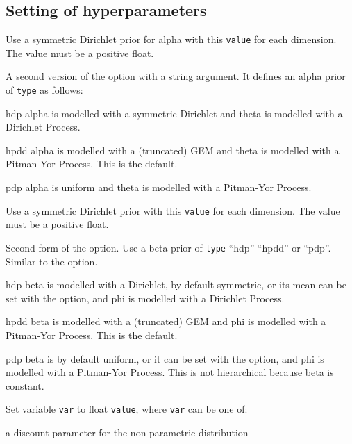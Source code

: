 \documentclass[a4paper,english]{article}
\begin{document}
\subsection{Setting of hyperparameters}
\begin{Description}\setlength{\itemsep}{0cm}
\item[\OptArg{-A}{value}]  Use a symmetric Dirichlet prior for alpha
with this \texttt{value} for each dimension.  The value must be a positive float.
\item[\OptArg{-A}{type}]  A second version of the
 option with a string argument.
It defines an alpha prior of \texttt{type} as follows:
\begin{Description}[hpdd]
\item[hdp] alpha is modelled with a symmetric Dirichlet and
theta is modelled with a Dirichlet Process.
\item[hpdd] alpha is modelled with a (truncated) GEM and
theta is modelled with a Pitman-Yor Process.
This is the default.
\item[pdp] alpha is uniform and theta is modelled with a Pitman-Yor Process.
\end{Description}
\item[\OptArg{-B}{value}]  Use a symmetric Dirichlet prior with
this \texttt{value} for each dimension.
The value must be a positive float.
\item[\OptArg{-B}{type}] 
Second form of the  option.
Use a beta prior of \texttt{type}
``hdp'' ``hpdd'' or ``pdp''.  Similar to the  option.
\begin{Description}[hpdd]
\item[hdp] beta is modelled with a Dirichlet,
by default symmetric,
or its mean can be set with the  option,
and phi is modelled with a Dirichlet Process.
\item[hpdd] beta is modelled with a (truncated) GEM and
phi is modelled with a Pitman-Yor Process.
This is the default.
\item[pdp] beta is by default uniform,
or it can be set with the  option,
and phi is modelled with a Pitman-Yor Process.
This is not hierarchical because beta is constant.
\end{Description}
\item[\OptArg{-S}{var=value}]  Set variable \texttt{var} to float \texttt{value},
where \texttt{var} can be one of:
\begin{Description}[bdk]
\item[a] discount parameter for the non-parametric distribution

\end{Description}
\end{Description}
\end{document}
